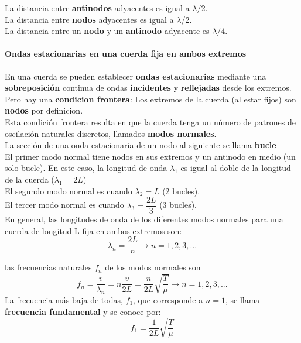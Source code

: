 \documentclass[10pt]{article}
\begin{document}
La distancia entre \textbf{antinodos} adyacentes es igual a $\lambda/2$.\\
La distancia entre \textbf{nodos} adyacentes es igual a $\lambda$/2.\\
La distancia entre un \textbf{nodo} y un \textbf{antinodo} adyacente es $\lambda$/4.\\

\paragraph{Ondas estacionarias en una cuerda fija
en ambos extremos}

En una cuerda se pueden establecer \textbf{ondas estacionarias} mediante una \textbf{sobreposición} continua de ondas
\textbf{incidentes} y \textbf{reflejadas} desde los extremos. Pero hay una \textbf{condicion frontera}: Los extremos de la cuerda (al estar fijos) son \textbf{nodos} por definicion.\\
\linebreak
Esta condición frontera resulta en que la cuerda tenga un número de 
patrones de oscilación naturales discretos, llamados \textbf{modos normales}.\\
La sección de una onda estacionaria de un nodo al siguiente se llama \textbf{bucle}\\
\linebreak
El primer modo normal tiene nodos en sus extremos y un antinodo en medio (un solo bucle). En este caso,
la longitud de onda $\lambda_1$ es igual al doble de la longitud de la cuerda ($\lambda_1 = 2L$)\\
\linebreak
El segundo modo normal es cuando $\lambda_2 = L$ (2 bucles).\\
\linebreak
El tercer modo normal es cuando $\lambda_3 = \dfrac{2L}{3}$ (3 bucles).\\
\linebreak
En general, las
longitudes de onda de los diferentes modos normales para una cuerda de longitud L fija
en ambos extremos son:
\begin{equation*}
	\lambda_n = \dfrac{2L}{n} \rightarrow n = 1,2,3,...
\end{equation*}

 las frecuencias naturales $f_n$ de los modos normales son
\begin{equation*}
	f_n = \dfrac{v}{\lambda_n} = n\dfrac{v}{2L} = \dfrac{n}{2L} \sqrt{\dfrac{T}{\mu}} \rightarrow n = 1,2,3,...
\end{equation*}
La frecuencia más baja de todas, $f_1$, que corresponde a $n = 1$, se llama \textbf{frecuencia fundamental } 
y se conoce por:
\begin{equation*}
	f_1 =  \dfrac{1}{2L} \sqrt{\dfrac{T}{\mu}}
\end{equation*}
\end{document}
